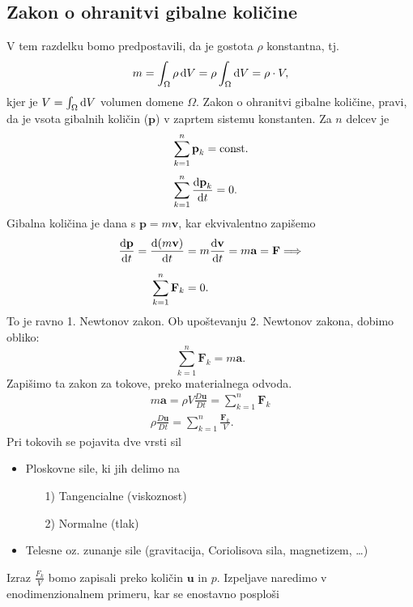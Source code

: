 \documentclass[mat2, tisk]{fmfdelo}
\newcommand{\bd}{\textbf}
\begin{document}
\subsection{Zakon o ohranitvi gibalne količine}
V tem razdelku bomo predpostavili, da je gostota $\rho$ konstantna, tj.
\begin{equation}
m = \int_\Omega \rho \dif V = \rho \int_\Omega \dif V = \rho \cdot V,
\end{equation}
kjer je $V = \int_\Omega \dif V$ volumen domene $\Omega$. Zakon o ohranitvi gibalne količine, 
pravi, da je vsota gibalnih količin ($\bd{p}$) v zaprtem sistemu konstanten. Za $n$ delcev je
\begin{align*}
&\sum_{k=1}^n \bd{p}_k = \text{const.} \\[1mm]
&\sum_{k=1}^n \frac{\dif \bd{p}_k}{\dif t} = 0.
\end{align*}
Gibalna količina je dana s $\bd{p} = m \bd{v}$, kar ekvivalentno zapišemo
\begin{align*}
\frac{\dif \bd{p}}{\dif t} = \frac{\dif \,(m \bd{v})}{\dif t} &= m\frac{\dif \bd{v}}{\dif t} = m \bd{a} = \bd{F} \Longrightarrow\\[2mm]
\sum_{k=1}^n \bd{F}_k &= 0.
\end{align*}
To je ravno 1. Newtonov zakon. Ob upoštevanju 2. Newtonov zakona, dobimo obliko:
\begin{equation}
\sum_{k=1}^n \bd{F}_k = m \bd{a}.
\end{equation}
Zapišimo ta zakon za tokove, preko materialnega odvoda.
\begin{align*}
m \bd{a} = \rho V \frac{D \bd{u}}{D t} = \sum_{k=1}^n \bd{F}_k \\
\rho \frac{D \bd{u}}{D t} = \sum_{k=1}^n \frac{\bd{F}_k}{V}. 
\end{align*}
Pri tokovih se pojavita dve vrsti sil 
\begin{itemize}
  \item Ploskovne sile, ki jih delimo na 
  \begin{enumerate}
    \item[1)] Tangencialne (viskoznost)
    \item[2)] Normalne (tlak)
  \end{enumerate}
  \item Telesne oz. zunanje sile (gravitacija, Coriolisova sila, magnetizem, \dots)
\end{itemize}
Izraz $\frac{F_k}{V}$ bomo zapisali preko količin $\bd{u}$ in $p$. 
Izpeljave naredimo v enodimenzionalnem primeru, kar se enostavno posploši 
\end{document}
